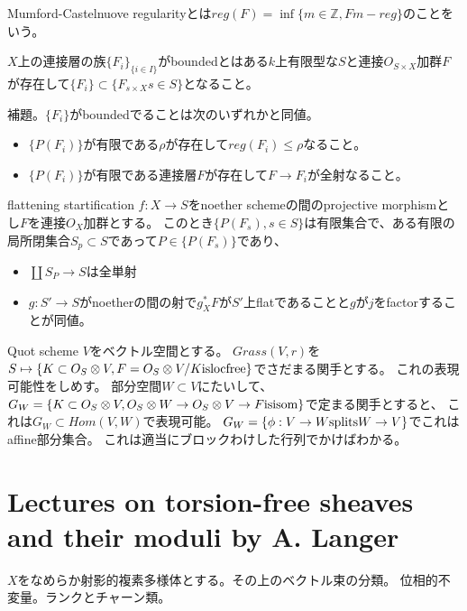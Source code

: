 \documentclass{jsarticle}
\begin{document}
Mumford-Castelnuove regularityとは$reg(F)=\inf\{m\in\mathbb{Z}, F m-reg\}$のことをいう。

$X$上の連接層の族$\{F_i\}_{\{i\in I\}}$がboundedとはある$k$上有限型な$S$と連接$O_{S\times X}$加群$F$が存在して$\{F_i\}\subset\{F_{s\times X} s\in S\}$となること。

補題。$\{F_i\}$がboundedでることは次のいずれかと同値。
\begin{itemize}
\item $\{P(F_i)\}$が有限である$\rho$が存在して$reg(F_i)\leq \rho$なること。
\item $\{P(F_i)\}$が有限である連接層$F$が存在して$F\to F_i$が全射なること。
\end{itemize}

flattening startification
$f:X\to S$をnoether schemeの間のprojective morphismとし$F$を連接$O_X$加群とする。
このとき$\{P(F_s), s\in S\}$は有限集合で、ある有限の局所閉集合$S_p\subset S$であって$P\in\{P(F_s)\}$であり、
\begin{itemize}
\item $\coprod S_P\to S$は全単射
\item $g:S'\to S$がnoetherの間の射で$g_X^*F$が$S'$上flatであることと$g$が$j$をfactorすることが同値。
\end{itemize}

Quot scheme
$V$をベクトル空間とする。
$Grass(V,r)$を$S\mapsto \{K\subset O_S\otimes V, F=O_S\otimes V/K {\rm is loc free}\}$でさだまる関手とする。
これの表現可能性をしめす。
部分空間$W\subset V$にたいして、$G_W=\{ K\subset O_S\otimes V, O_S\otimes W\to O_S\otimes V \to F {\rm is isom}\}$で定まる関手とすると、
これは$G_W\subset Hom(V, W)$で表現可能。
$G_W=\{\phi: V\to W {\rm splits} W\to V\}$でこれはaffine部分集合。
これは適当にブロックわけした行列でかけばわかる。

\section{Lectures on torsion-free sheaves and their moduli by A. Langer}
$X$をなめらか射影的複素多様体とする。その上のベクトル束の分類。
位相的不変量。ランクとチャーン類。
\end{document}
